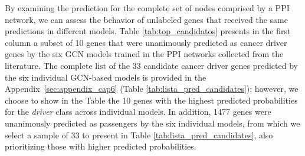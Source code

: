 By examining the prediction for the complete set of nodes comprised by a PPI network, we can assess the behavior of unlabeled genes that received the same predictions in different models. 
Table \ref{tab:top_candidatos} presents in the first column a subset of 10 genes that were unanimously predicted as cancer driver genes by the six GCN models trained in the PPI networks collected from the literature. The complete list of the 33 candidate cancer driver genes predicted by the six individual GCN-based models is provided in the Appendix~\ref{sec:appendix_cap6} (Table \ref{tab:lista_pred_candidates}); however, we choose to show in the Table the 10 genes with the highest predicted probabilities for the \textit{driver} class across individual models. In addition, 1477 genes were unanimously predicted as passengers by the six individual models, from which we select a sample of 33 to present in Table \ref{tab:lista_pred_candidates}, also prioritizing those with higher predicted probabilities.


